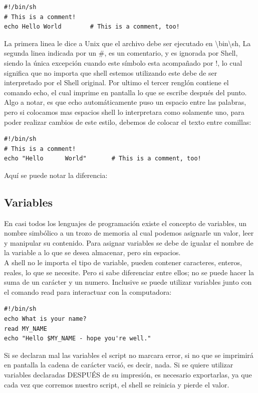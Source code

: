 \documentclass[12pt]{article}
\begin{document}
\begin{verbatim}
#!/bin/sh
# This is a comment!
echo Hello World        # This is a comment, too!
\end{verbatim}

La primera linea le dice a Unix que el archivo debe ser ejecutado en 
\textbackslash bin\textbackslash sh, La segunda linea indicada por un \#, es un comentario, y es ignorada por Shell, siendo la única excepción cuando este símbolo esta acompañado por !, lo cual significa que no importa que shell estemos utilizando este debe de ser interpretado por el Shell original. Por ultimo el tercer renglón contiene el comando echo, el cual imprime en pantalla lo que se escribe después del punto. \\

Algo a notar, es que echo automáticamente puso un espacio entre las palabras, pero si colocamos mas espacios shell lo interpretara como solamente uno, para poder realizar cambios de este estilo, debemos de colocar el texto entre comillas:

\begin{verbatim}
#!/bin/sh
# This is a comment!
echo "Hello      World"       # This is a comment, too!
\end{verbatim}

Aquí se puede notar la diferencia: 

\subsection{Variables}
En casi todos los lenguajes de programación existe el concepto de variables, un nombre simbólico a un trozo de memoria al cual podemos asignarle un valor, leer y manipular su contenido. Para asignar variables se debe de igualar el nombre de la variable a lo que se desea almacenar, pero sin espacios. \\

A shell no le importa el tipo de variable, pueden contener caracteres, enteros, reales, lo que se necesite. Pero si sabe diferenciar entre ellos; no se puede hacer la suma de un carácter y un numero. Inclusive se puede utilizar variables junto con el comando read para interactuar con la computadora:

\begin{verbatim}
#!/bin/sh
echo What is your name?
read MY_NAME
echo "Hello $MY_NAME - hope you're well."
\end{verbatim}

Si se declaran mal las variables el script no marcara error, si no que se imprimirá en pantalla la cadena de carácter vació, es decir, nada. Si se quiere utilizar variables declaradas DESPUÉS de su impresión, es necesario exportarlas, ya que cada vez que corremos nuestro script, el shell se reinicia y pierde el valor.  \\
\end{document}

